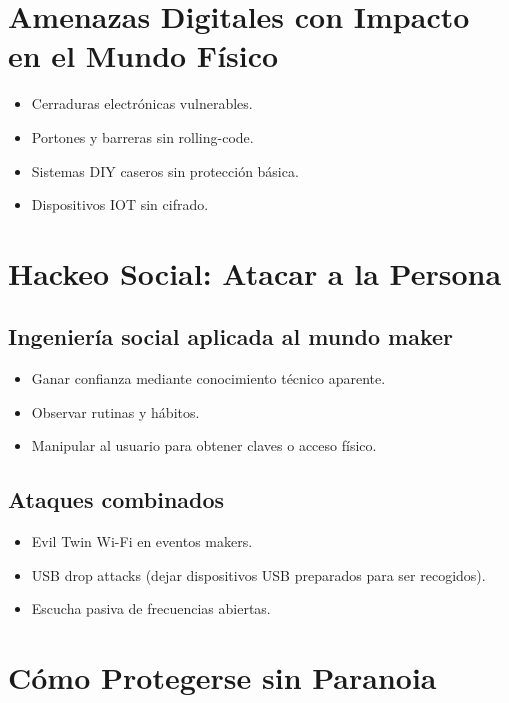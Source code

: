 \documentclass[a4paper,12pt]{article}
\begin{document}
\section{Amenazas Digitales con Impacto en el Mundo Físico}

\begin{itemize}
    \item Cerraduras electrónicas vulnerables.
    \item Portones y barreras sin rolling-code.
    \item Sistemas DIY caseros sin protección básica.
    \item Dispositivos IOT sin cifrado.
\end{itemize}

\section{Hackeo Social: Atacar a la Persona}

\subsection{Ingeniería social aplicada al mundo maker}

\begin{itemize}
    \item Ganar confianza mediante conocimiento técnico aparente.
    \item Observar rutinas y hábitos.
    \item Manipular al usuario para obtener claves o acceso físico.
\end{itemize}

\subsection{Ataques combinados}

\begin{itemize}
    \item Evil Twin Wi-Fi en eventos makers.
    \item USB drop attacks (dejar dispositivos USB preparados para ser recogidos).
    \item Escucha pasiva de frecuencias abiertas.
\end{itemize}

\section{Cómo Protegerse sin Paranoia}
\end{document}
